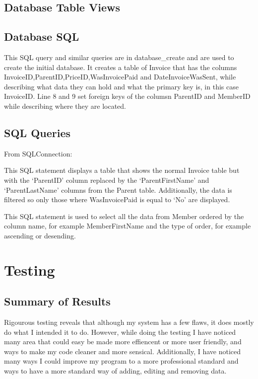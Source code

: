 \subsection{Database Table Views}

\subsection{Database SQL}


This SQL query and similar queries are in database\_create and are used to create the initial database. It creates a table of  Invoice that has the columns InvoiceID,ParentID,PriceID,WasInvoicePaid and DateInvoiceWasSent, while describing what data they can hold and what the primary key is, in this case InvoiceID. Line 8 and 9 set foreign keys of the columsn ParentID and MemberID while describing where they are located.

\subsection{SQL Queries}

From SQLConnection:


This SQL statement displays a table that shows the normal Invoice table but with the `ParentID' column replaced by the `ParentFirstName' and `ParentLastName' columns from the Parent table. Additionally, the data is filtered so only those where WasInvoicePaid is equal to `No' are displayed.


This SQL statement is used to select all the data from Member ordered by the column name, for example MemberFirstName and the type of order, for example ascending or desending.

\section{Testing}

\subsection{Summary of Results}
Rigourous testing reveals that although my system has a few flaws, it does mostly do what I intended it to do. However, while doing the testing I have noticed many area that could easy be made more effiencent or more user friendly, and ways to make my code cleaner and more sensical. Additionally, I have noticed many ways I could improve my program to a more professional standard and ways to have a more standard way of adding, editing and removing data.

